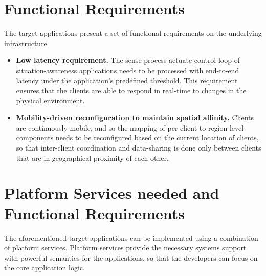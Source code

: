\section{Functional Requirements}
The target applications present a set of functional requirements on the underlying infrastructure. 
\begin{itemize}
\item \textbf{Low latency requirement. } The sense-process-actuate control loop of situation-awareness applications needs to be processed with end-to-end latency under the application's predefined threshold. This requirement ensures that the clients are able to respond in real-time to changes in the physical environment.
\item \textbf{Mobility-driven reconfiguration to maintain spatial affinity. } Clients are continuously mobile, and so the mapping of per-client to region-level components needs to be reconfigured based on the current location of clients, so that inter-client coordination and data-sharing is done only between clients that are in geographical proximity of each other.
\end{itemize}
\section{Platform Services needed and Functional Requirements}
The aforementioned target applications can be implemented using a combination of platform services. Platform services provide the necessary systems support with powerful semantics for the applications, so that the developers can focus on the core application logic.

